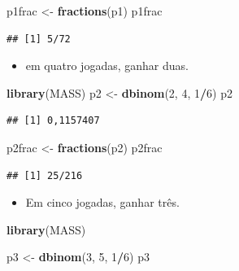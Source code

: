 \documentclass[
]{book}
\newenvironment{Shaded}{\begin{snugshade}}{\end{snugshade}}
\newcommand{\DecValTok}[1]{\textcolor[rgb]{0.00,0.00,0.81}{#1}}
\newcommand{\KeywordTok}[1]{\textcolor[rgb]{0.13,0.29,0.53}{\textbf{#1}}}
\newcommand{\NormalTok}[1]{#1}
\newcommand{\OperatorTok}[1]{\textcolor[rgb]{0.81,0.36,0.00}{\textbf{#1}}}
\newcommand{\StringTok}[1]{\textcolor[rgb]{0.31,0.60,0.02}{#1}}
\providecommand{\tightlist}{%
  \setlength{\itemsep}{0pt}\setlength{\parskip}{0pt}}
\begin{document}
\begin{Shaded}
\begin{Highlighting}[]
\NormalTok{p1frac <-}\StringTok{ }\KeywordTok{fractions}\NormalTok{(p1)}
\NormalTok{p1frac}
\end{Highlighting}
\end{Shaded}

\begin{verbatim}
## [1] 5/72
\end{verbatim}

\begin{itemize}
\tightlist
\item
  em quatro jogadas, ganhar duas.
\end{itemize}

\begin{Shaded}
\begin{Highlighting}[]
\KeywordTok{library}\NormalTok{(MASS)}
\NormalTok{p2 <-}\StringTok{ }\KeywordTok{dbinom}\NormalTok{(}\DecValTok{2}\NormalTok{, }\DecValTok{4}\NormalTok{, }\DecValTok{1}\OperatorTok{/}\DecValTok{6}\NormalTok{)}
\NormalTok{p2}
\end{Highlighting}
\end{Shaded}

\begin{verbatim}
## [1] 0,1157407
\end{verbatim}

\begin{Shaded}
\begin{Highlighting}[]
\NormalTok{p2frac <-}\StringTok{ }\KeywordTok{fractions}\NormalTok{(p2)}
\NormalTok{p2frac}
\end{Highlighting}
\end{Shaded}

\begin{verbatim}
## [1] 25/216
\end{verbatim}

\begin{itemize}
\tightlist
\item
  Em cinco jogadas, ganhar três.
\end{itemize}

\begin{Shaded}
\begin{Highlighting}[]
\KeywordTok{library}\NormalTok{(MASS)}

\NormalTok{p3 <-}\StringTok{ }\KeywordTok{dbinom}\NormalTok{(}\DecValTok{3}\NormalTok{, }\DecValTok{5}\NormalTok{, }\DecValTok{1}\OperatorTok{/}\DecValTok{6}\NormalTok{)}
\NormalTok{p3}
\end{Highlighting}
\end{Shaded}
\end{document}
